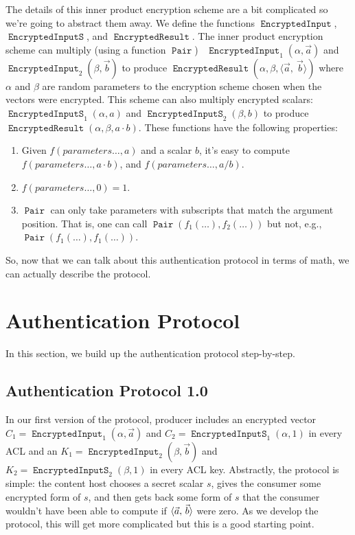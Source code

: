 \documentclass[pdftex,12pt,a4papaer,twoside,notitlepage]{report}
\DeclareMathOperator{\ein}{\mathtt{EncryptedInput}}
\DeclareMathOperator{\pair}{\mathtt{Pair}}
\DeclareMathOperator{\eins}{\mathtt{EncryptedInputS}}
\DeclareMathOperator{\eout}{\mathtt{EncryptedResult}}
\begin{document}
The details of this inner product encryption scheme are a bit complicated so
we're going to abstract them away. We define the functions $\ein$, $\eins$, and
$\eout$. The inner product encryption scheme can multiply (using a function
$\pair$) \, $\ein_1(\alpha, \vec{a})$ and $\ein_2(\beta, \vec{b})$ to produce
$\eout(\alpha, \beta, \langle\vec{a},~\vec{b}\rangle)$ where $\alpha$ and
$\beta$ are random parameters to the encryption scheme chosen when the vectors
were encrypted. This scheme can also multiply encrypted scalars: $\eins_1(\alpha,
a)$ and $\eins_2(\beta, b)$ to produce $\eout(\alpha, \beta, a \cdot b)$. These
functions have the following properties:

\begin{enumerate}
\item Given $f(\mathit{parameters}\ldots, a)$ and a scalar $b$, it's easy to compute
  $f(\mathit{parameters}\ldots, a\cdot b)$, and $f(\mathit{parameters}\ldots, a/b)$.
\item $f(\mathit{parameters}\ldots, 0) = 1$.
  \item $\pair$ can only take parameters with subscripts that match the argument
    position. That is, one can call $\pair(f_1(\ldots), f_2(\ldots))$ but not, e.g., $\pair(f_1(\ldots), f_1(\ldots))$.
\end{enumerate}

So, now that we can talk about this authentication protocol in terms of math, we
can actually describe the protocol.

\section{Authentication Protocol}

In this section, we build up the authentication protocol step-by-step. 

\subsection{Authentication Protocol 1.0}

In our first version of the protocol, producer includes an encrypted vector $C_1
= \ein_1(\alpha, \vec{a})$ and $C_2 = \eins_1(\alpha, 1)$ in every ACL and an
$K_1 = \ein_2(\beta, \vec{b})$ and $K_2 = \eins_2(\beta, 1)$ in every ACL key.
Abstractly, the protocol is simple: the content host chooses a secret scalar
$s$, gives the consumer some encrypted form of $s$, and then gets back some form
of $s$ that the consumer wouldn't have been able to compute if
$\langle \vec{a},\,\vec{b}\rangle$ were zero. As we develop the protocol, this will get
more complicated but this is a good starting point.
\end{document}
